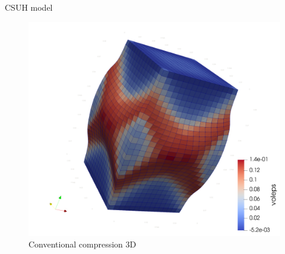\documentclass[aspectratio=169]{beamer}
\begin{document}
\begin{frame}{CSUH model}
\begin{minipage}[c]{0.52\linewidth}
\begin{figure}
			\includegraphics[width=0.47\linewidth]{./pic/csuh/e0.7_p0_1e5_volEps.png}
			\caption{Conventional compression 3D}
			\label{fig: csuh conventional compression}
		\end{figure}
	\end{minipage}

\end{frame}
\end{document}
